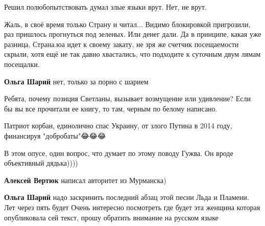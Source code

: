 \begin{itemize}
\begin{itemize}
Решил полюбопытствовать думал злые языки врут. Нет, не врут.

Жаль, в своё время только Страну и читал... Видимо блокировкой пригрозили, раз
пришлось прогнуться под зеленых. Или денег дали. Да в принципе, какая уже
разница, Страна.юа идет к своему закату, не зря же счетчик посещаемости скрыли,
хотя ещё не так давно хвастались, что подходите к суточным двум лямам
посещалки.

 
\textbf{Ольга Шарий} нет, только за порно с шарием

 

Ребята, почему позиция Светланы, вызывает возмущение или удивление? Если бы вы
все прочитали ее книгу, то там, черным по белому написано.

Патриот корбан, единолично спас Украину, от злого Путина в 2014 году,
финансируя "добробаты"😂😂😂

В этом опусе, один вопрос, что думает по этому поводу Гужва. Он вроде
объективный дядька))))

 
\textbf{Алексей Вертюк} написал авторитет из Мурманска)

 
\textbf{Ольга Шарий} надо заскринить последний абзац этой песни Льда и Пламени. Лет через пять будет Очень интересно посмотреть где будет эта женщина которая опубликовала сей текст, прошу обратить внимание на русском языке

 

\end{itemize}
\end{itemize}
